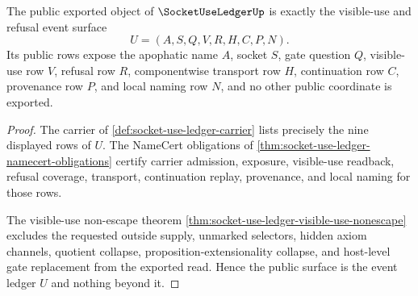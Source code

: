 \begin{theorem}
\label{thm:socket-use-ledger-public-event-surface}
The public exported object of $\SocketUseLedgerUp$ is exactly the visible-use and refusal event surface
$$
U=(A,S,Q,V,R,H,C,P,N).
$$
Its public rows expose the apophatic name $A$, socket $S$, gate question $Q$, visible-use row $V$, refusal row $R$, componentwise transport row $H$, continuation row $C$, provenance row $P$, and local naming row $N$, and no other public coordinate is exported.
\end{theorem}
\begin{proof}
The carrier of \autoref{def:socket-use-ledger-carrier} lists precisely the nine displayed rows of $U$. The NameCert obligations of \autoref{thm:socket-use-ledger-namecert-obligations} certify carrier admission, exposure, visible-use readback, refusal coverage, transport, continuation replay, provenance, and local naming for those rows.

The visible-use non-escape theorem \autoref{thm:socket-use-ledger-visible-use-nonescape} excludes the requested outside supply, unmarked selectors, hidden axiom channels, quotient collapse, proposition-extensionality collapse, and host-level gate replacement from the exported read. Hence the public surface is the event ledger $U$ and nothing beyond it.
\end{proof}



